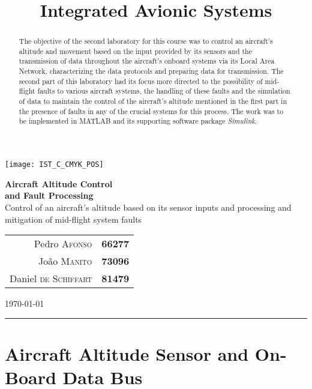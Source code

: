 \documentclass[english,palatino]{ist-report}
\title{Integrated Avionic Systems}
\begin{document}
\thispagestyle{empty}

\begin{center}
	\texttt{[image: IST\_C\_CMYK\_POS]}
	
	\vspace*{3mm}
	{\huge \textbf{Aircraft Altitude Control\\and Fault Processing}} \\
	\vspace*{4mm}
	{\large Control of an aircraft's altitude based on its sensor inputs and processing and mitigation of mid-flight system faults}
	\vspace*{4mm} \\
	\begin{tabular}{r l}
		Pedro \textsc{Afonso} & \textbf{66277} \\
		João \textsc{Manito} & \textbf{73096} \\
		Daniel \textsc{de Schiffart} & \textbf{81479}
	\end{tabular}
	
	\vspace*{3mm}
	{\Large \today}
	\vspace*{4mm} \\
	\rule{\linewidth}{0.5pt}
\end{center}

\begin{abstract}
	The objective of the second laboratory for this course was to control an aircraft's altitude and movement based on the input provided by its sensors and the transmission of data throughout the aircraft's onboard systems via its Local Area Network, characterizing the data protocols and preparing data for transmission. The second part of this laboratory had its focus more directed to the possibility of mid-flight faults to various aircraft systems, the handling of these faults and the simulation of data to maintain the control of the aircraft's altitude mentioned in the first part in the presence of faults in any of the crucial systems for this process. The work was to be implemented in MATLAB and its supporting software package \textit{Simulink}.
\end{abstract}

{\hypersetup{linkcolor = black} \tableofcontents}

\part{Aircraft Altitude Sensor and On-Board Data Bus}
\end{document}
